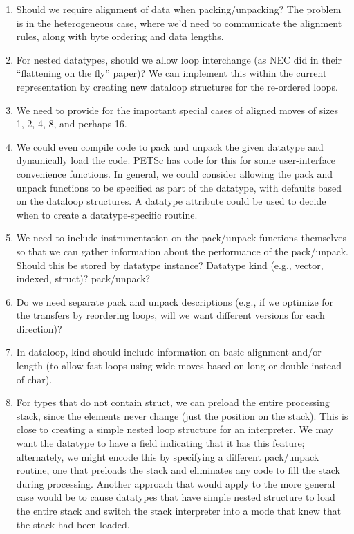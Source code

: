 \documentclass{article}
\begin{document}
\begin{enumerate}
\item Should we require alignment of data when packing/unpacking?  The
   problem is in the heterogeneous case, where we'd need to communicate
   the alignment rules, along with byte ordering and data lengths.

\item For nested datatypes, should we allow loop interchange (as NEC did
   in their ``flattening on the fly'' paper)?  We can implement this
   within the current representation by creating new dataloop
   structures for the re-ordered loops.  

\item We need to provide for the important special cases of aligned moves
   of sizes 1, 2, 4, 8, and perhaps 16.

\item We could even compile code to pack and unpack the given datatype
   and dynamically load the code.  PETSc has code for this for some
   user-interface convenience functions.  In general, we could
   consider allowing the pack and unpack functions to be specified as
   part of the datatype, with defaults based on the dataloop
   structures.  A datatype attribute could be used to decide when to
   create a datatype-specific routine.

\item We need to include instrumentation on the pack/unpack functions
   themselves so that we can gather information about the performance
   of the pack/unpack.  Should this be stored by datatype instance?
   Datatype kind (e.g., vector, indexed, struct)?  pack/unpack?

\item Do we need separate pack and unpack descriptions (e.g., if we
   optimize for the transfers by reordering loops, will we want
   different versions for each direction)?

\item In dataloop, kind should include information on basic alignment
   and/or length (to allow fast loops using wide moves based on long
   or double instead of char).

\item For types that do not contain struct, we can preload the entire
   processing stack, since the elements never change (just the
   position on the stack).  This is close to creating a simple nested
   loop structure for an interpreter.  We may want the datatype to
   have a field indicating that it has this feature; alternately, we
   might encode this by specifying a different pack/unpack routine,
   one that preloads the stack and eliminates any code to fill the
   stack during processing.  Another approach that would apply to the
   more general case would be to cause datatypes that have simple
   nested structure to load the entire stack and switch the stack
   interpreter into a mode that knew that the stack had been loaded.


\end{enumerate}
\end{document}
